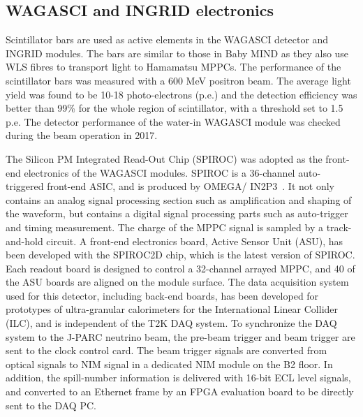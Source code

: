 \subsection{WAGASCI and INGRID electronics}

Scintillator bars are used as active elements in the WAGASCI detector and INGRID modules. The bars are similar to those in Baby MIND as they also use WLS fibres to transport light to Hamamatsu MPPCs. The performance of the scintillator bars was measured with a 600 MeV positron beam. The average light yield was found to be 10-18 photo-electrons (p.e.) and the detection efficiency was better than 99\% for the whole region of scintillator, with a threshold set to 1.5 p.e.  The detector performance of the water-in WAGASCI module was checked during the beam operation in 2017.

The Silicon PM Integrated Read-Out Chip (SPIROC) was adopted as the front-end electronics of the WAGASCI modules. SPIROC is a 36-channel auto-triggered front-end ASIC, and is produced by OMEGA/ IN2P3~\cite{116Seguin-Moreau}. 
It not only contains an analog signal processing section such as amplification and shaping of the waveform, but contains a digital signal processing parts such as auto-trigger and timing measurement. The charge of the MPPC signal is sampled by a track-and-hold circuit. A front-end electronics board, Active Sensor Unit (ASU), has been developed with the SPIROC2D chip, which is the latest version of SPIROC.  Each readout board is designed to control a 32-channel arrayed MPPC, and 40 of the ASU boards are aligned on the module surface. The data acquisition system used for this detector, including back-end boards, has been developed for prototypes of ultra-granular calorimeters for the International Linear Collider (ILC), and is independent of the T2K DAQ system. To synchronize the DAQ system to the J-PARC neutrino beam, the pre-beam trigger and beam trigger are sent to the clock control card. The beam trigger signals are converted from optical signals to NIM signal in a dedicated NIM module on the B2 floor. In addition, the spill-number information is delivered with 16-bit ECL level signals, and converted to an Ethernet frame by an FPGA evaluation board to be directly sent to the DAQ PC.

